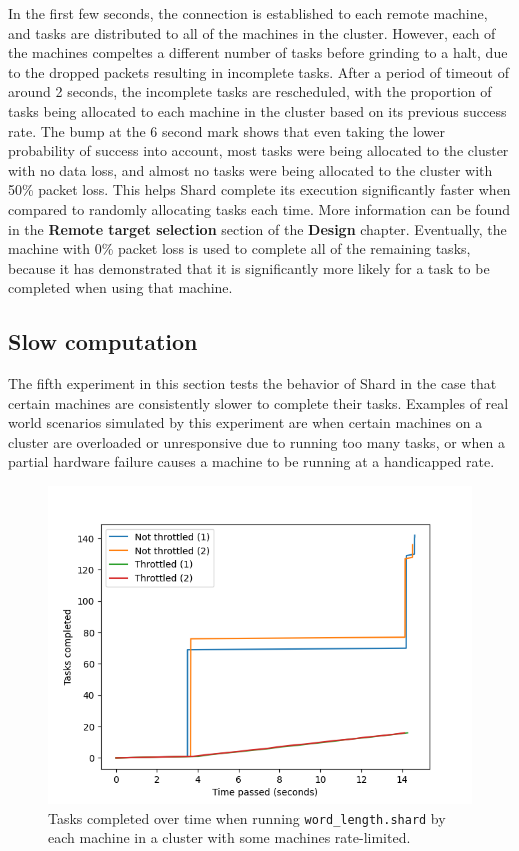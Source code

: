 \documentclass[twoside]{report}
\begin{document}
In the first few seconds, the connection is established to each remote machine, and tasks are distributed to all of the machines in the cluster.
However, each of the machines compeltes a different number of tasks before grinding to a halt, due to the dropped packets resulting in incomplete tasks.
After a period of timeout of around 2 seconds, the incomplete tasks are rescheduled, with the proportion of tasks being allocated to each machine in the cluster based on its previous success rate.
The bump at the 6 second mark shows that even taking the lower probability of success into account, most tasks were being allocated to the cluster with no data loss, and almost no tasks were being allocated to the cluster with 50\% packet loss.
This helps Shard complete its execution significantly faster when compared to randomly allocating tasks each time.
More information can be found in the \textbf{Remote target selection} section of the \textbf{Design} chapter.
Eventually, the machine with 0\% packet loss is used to complete all of the remaining tasks, because it has demonstrated that it is significantly more likely for a task to be completed when using that machine.

\subsection{Slow computation}
The fifth experiment in this section tests the behavior of Shard in the case that certain machines are consistently slower to complete their tasks.
Examples of real world scenarios simulated by this experiment are when certain machines on a cluster are overloaded or unresponsive due to running too many tasks, or when a partial hardware failure causes a machine to be running at a handicapped rate.

\begin{figure}[h]
  \begin{center}
    \includegraphics[scale=0.9]{img/experiments/e11_1620960581241.png}
    \caption{Tasks completed over time when running \texttt{word\_length.shard} by each machine in a cluster with some machines rate-limited.}
    \label{fig:slowwordlength}
  \end{center}
\end{figure}
\end{document}

